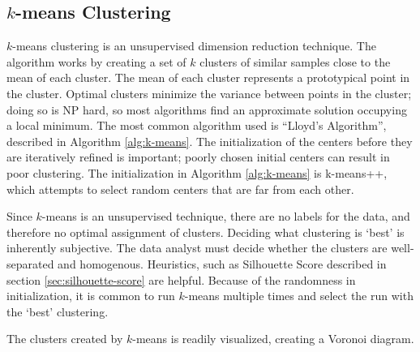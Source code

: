 \documentclass[11pt]{amsart}
\begin{document}
\subsection*{\(k\)-means Clustering}\label{sec:k-means}

\(k\)-means clustering is an unsupervised dimension reduction technique. The
algorithm works by creating a set of \(k\) clusters of similar samples close to
the mean of each cluster. The mean of each cluster represents a prototypical
point in the cluster. Optimal clusters minimize the variance between points in
the cluster; doing so is NP hard, so most algorithms find an approximate
solution occupying a local minimum. The most common algorithm used is ``Lloyd's
Algorithm'', described in Algorithm \ref{alg:k-means}. The initialization of the
centers before they are iteratively refined is important; poorly chosen initial
centers can result in poor clustering. The initialization in Algorithm
\ref{alg:k-means} is k-means++, which attempts to select random centers that are
far from each other.

Since \(k\)-means is an unsupervised technique, there are no labels for the
data, and therefore no optimal assignment of clusters. Deciding what clustering
is `best' is inherently subjective. The data analyst must decide whether the
clusters are well-separated and homogenous. Heuristics, such as Silhouette Score
described in section \ref{sec:silhouette-score} are helpful. Because of the
randomness in initialization, it is common to run \(k\)-means multiple times and
select the run with the `best' clustering.

The clusters created by \(k\)-means is readily visualized, creating a Voronoi
diagram.
\end{document}
